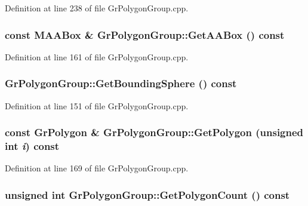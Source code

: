 Definition at line 238 of file GrPolygonGroup.cpp.\hypertarget{class_gr_polygon_group_f036e17871ac905b28a8e9c90da6d0e6}{
\subsubsection[{GetAABox}]{\setlength{\rightskip}{0pt plus 5cm}const {\bf MAABox} \& GrPolygonGroup::GetAABox () const}}
\label{class_gr_polygon_group_f036e17871ac905b28a8e9c90da6d0e6}




Definition at line 161 of file GrPolygonGroup.cpp.\hypertarget{class_gr_polygon_group_ebce104e3d59538c74e2701e98542afa}{
\subsubsection[{GetBoundingSphere}]{ GrPolygonGroup::GetBoundingSphere () const}}
\label{class_gr_polygon_group_ebce104e3d59538c74e2701e98542afa}




Definition at line 151 of file GrPolygonGroup.cpp.\hypertarget{class_gr_polygon_group_267706848b196a4f1b7b0ebdeeb7188e}{
\subsubsection[{GetPolygon}]{\setlength{\rightskip}{0pt plus 5cm}const {\bf GrPolygon} \& GrPolygonGroup::GetPolygon (unsigned int {\em i}) const}}
\label{class_gr_polygon_group_267706848b196a4f1b7b0ebdeeb7188e}




Definition at line 169 of file GrPolygonGroup.cpp.\hypertarget{class_gr_polygon_group_3e0a4ae8030ded12301495eed40135df}{
\subsubsection[{GetPolygonCount}]{\setlength{\rightskip}{0pt plus 5cm}unsigned int GrPolygonGroup::GetPolygonCount () const}}
\label{class_gr_polygon_group_3e0a4ae8030ded12301495eed40135df}




